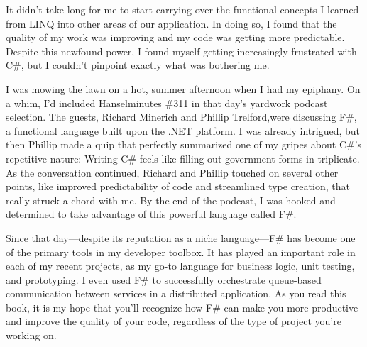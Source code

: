 \documentclass{book}
\begin{document}
It didn’t take long for me to start carrying over the functional concepts I learned from LINQ into other areas of our application. In doing so, I found that the quality of my work was improving and my code was getting more predictable. Despite this newfound power, I found myself getting increasingly frustrated with C\#, but I couldn’t pinpoint exactly what was bothering me.

I was mowing the lawn on a hot, summer afternoon when I had my epiphany. On a whim, I’d included Hanselminutes \#311 in that day’s yardwork podcast selection. The guests, Richard Minerich and Phillip Trelford,were discussing F\#, a functional language built upon the .NET platform. I was already intrigued, but then Phillip made a quip that perfectly summarized one of my gripes about C\#’s repetitive nature: Writing C\# feels like filling out government forms in triplicate. As the conversation continued, Richard and Phillip touched on several other points, like improved predictability of code and streamlined type creation, that really struck a chord with me. By the end of the podcast, I was hooked and determined to take advantage of this powerful language called F\#.

Since that day—despite its reputation as a niche language—F\# has become one of the primary tools in my developer toolbox. It has played an important role in each of my recent projects, as my go-to language for business logic, unit testing, and prototyping. I even used F\# to successfully orchestrate queue-based communication between services in a distributed application. As you read this book, it is my hope that you’ll recognize how F\# can make you more productive and improve the quality of your code, regardless of the type of project you’re working on.
\end{document}
